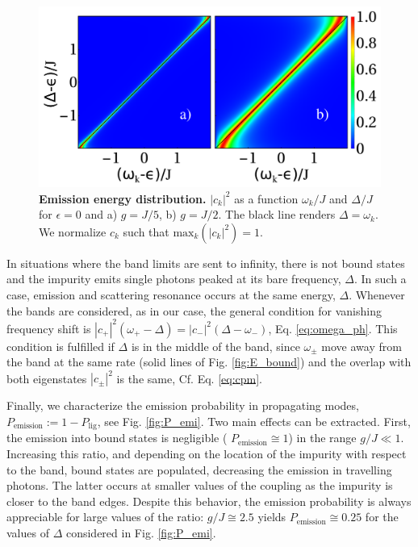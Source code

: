 \documentclass[aps,pra,twocolumn,floatfix,superscriptaddress]{revtex4-1}%
\begin{document}
\begin{figure}[thb!]
\includegraphics[width=1.0\columnwidth]{e_vs_w_Delta_g_0_2_0_5.pdf}
\caption{{\bf Emission energy distribution.} $|c_k|^2$ as a function $\omega_k/J$ and $\Delta/J$ for $\epsilon=0$ and a) $g=J/5$, b) $g=J/2$. The black line renders $\Delta=\omega_k$. We normalize $c_k$ such that $\text{max}_k(|c_k|^2)=1$.}\label{fig:c_k}
\end{figure}

In situations where the band limits are sent to infinity, there is not bound states and the impurity emits single photons peaked at its bare frequency, $\Delta$.  In such a case, emission and scattering resonance occurs at the same energy, $\Delta$.   Whenever the bands are considered, as in our case,  the general  condition for vanishing frequency shift is $|c_+|^2(\omega_+-\Delta)=|c_-|^2(\Delta-\omega_-)$, Eq. \eqref{eq:omega_ph}. This condition is fulfilled if $\Delta$ is in the middle of the band, since $\omega_\pm$ move away from the band at the same rate (solid lines of Fig. \ref{fig:E_bound}) and the overlap with both eigenstates $|c_\pm|^2$ is the same, Cf. Eq. \eqref{eq:cpm}. 

Finally, we characterize the emission probability in propagating modes, $P_\text{emission}:=1-P_\text{lig}$, see Fig. \ref{fig:P_emi}.  Two main effects can be extracted.  First, the emission into bound states is negligible ( $P_\text{emission} \cong 1$) in the range $g/J \ll1$.   Increasing this ratio, and depending on the location of the impurity with respect to the band, bound states are populated, decreasing the emission in travelling photons. The latter occurs at smaller values of the coupling as the impurity is closer to the band edges.  Despite this behavior, the emission probability is always appreciable for large values of the ratio: $g/J \cong 2.5$ yields $P_\text{emission} \cong 0.25$ for the values of $\Delta$ considered in Fig. \ref{fig:P_emi}.
\end{document}
